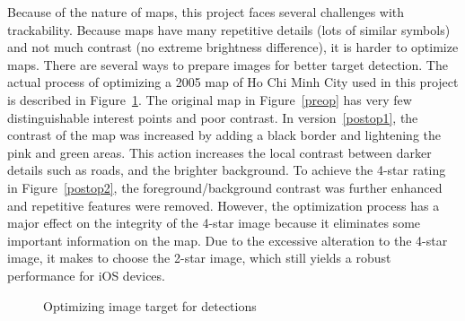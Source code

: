 Because of the nature of maps, this project faces several challenges with trackability. Because maps have many repetitive details (lots of similar symbols) and not much contrast (no extreme brightness difference), it is harder to optimize maps. There are several ways to prepare images for better target detection. The actual process of optimizing a 2005 map of Ho Chi Minh City used in this project is described in Figure~\ref{optimize}. The original map in Figure~\ref{preop} has very few distinguishable interest points and poor contrast. In version~\ref{postop1}, the contrast of the map was increased by adding a black border and lightening the pink and green areas. This action increases the local contrast between darker details such as roads, and the brighter background. To achieve the 4-star rating in Figure~\ref{postop2}, the foreground/background contrast was further enhanced and repetitive features were removed. However, the optimization process has a major effect on the integrity of the 4-star image because it eliminates some important information on the map. Due to the excessive alteration to the 4-star image, it makes to choose the 2-star image, which still yields a robust performance for iOS devices. 

\begin{figure}[!ht]\centering
{}
\qquad
{}
\vspace{-.2 in}
\caption{Optimizing image target for detections}\label{optimize}
\end{figure}

